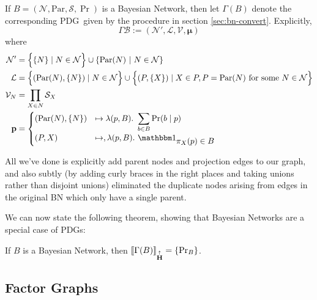 \documentclass{article}
\newcommand{\MN}{PDG}%
\newcommand{\MNs}{PDGs}
\newcommand\MaxEnt{{\overset{\uparrow}{\mathbf H}}}
\newcommand\bmu{\boldsymbol{\mu}}
\begin{document}
	
		\begin{defn}
			If $B = (\mathcal N, \mathrm{Par}, \mathcal S, \Pr)$ is a Bayesian Network, then let $\Gamma (B)$ denote the corresponding \MN\ given by the procedure in section \ref{sec:bn-convert}. Explicitly, 
			\[ \Gamma\mathcal B :=  (\mathcal N', \mathcal L, \mathcal V, \bmu) \]
			where %
			\begin{align*}
				\mathcal N' &=  \left\{ \Big.\{N\} \mid N \in \mathcal N\right\} \cup \left\{ \mathrm{Par}(N) ~\middle|~ N \in \cal N \right\} \\%
				\mathcal L &= \left\{ \vphantom{\Big|}(\mathrm{Par}(N), \{N\}) \mid N \in \mathcal N \right\} \cup 
					\left\{\vphantom{\Big|} (P, \{X\}) \mid X \in P, P = \mathrm{Par}(N) \text{ for some }N \in \mathcal N \right\} \\
				\mathcal V_N &= \prod_{X \in N} \mathcal S_X \\
				\mathbf p &= \begin{cases}
					 	(\mathrm{Par}(N), \{N\}) &\mapsto \lambda(p, B).~ \displaystyle\sum_{b \in  B} \Pr(b \mid p) \\
					 	(P, X) &\mapsto, \lambda (p, B).~ \displaystyle \mathbbm 1_{\displaystyle\pi_X(p) \in B}
					\end{cases}
			\end{align*}
		\end{defn}
		All we've done is explicitly add parent nodes and projection edges to our graph, and also subtly (by adding curly braces in the right places and taking unions rather than disjoint unions) eliminated the duplicate nodes arising from edges in the original BN which only have a single parent.
		
		We can now state the following theorem, showing that Bayesian Networks are a special case of \MNs: 
		\begin{theorem}
			If $B$ is a Bayesian Network, then $\bbr{\Gamma(B)}_\MaxEnt =\{\Pr_B\}$.
		\end{theorem}
	
	\subsection{Factor Graphs} \label{sec:factor-graphs}
	
	
\end{document}
